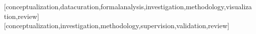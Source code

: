 \documentclass[english]{textolivre}
\begin{document}
\printbibliography\label{sec-bib}


\begin{contributors}
[conceptualization,datacuration,formalanalysis,investigation,methodology,visualization,review]
[conceptualization,investigation,methodology,supervision,validation,review]
\end{contributors}
\end{document}
